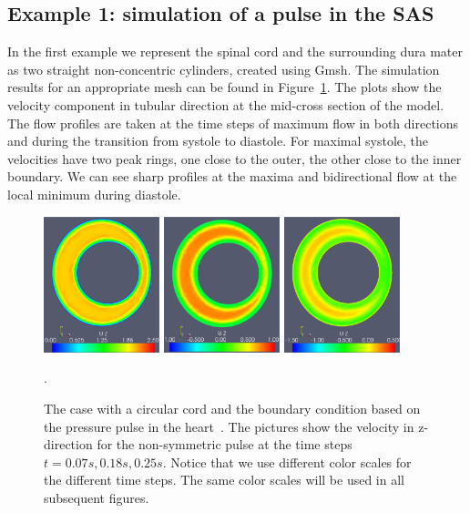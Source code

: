 \subsection{Example 1: simulation of a pulse in the SAS}

In the first example we represent the spinal cord and the surrounding dura mater as two straight non-concentric cylinders, created using Gmsh.
The simulation results for an appropriate mesh can be found in
Figure~\ref{fig:case1}. The plots show the velocity component in tubular direction
at the mid-cross section of the model. The flow profiles are taken at
the time steps of maximum flow in both directions and during the
transition from systole to diastole. For maximal systole, the
velocities have two peak rings, one close to the outer, the other
close to the inner boundary. We can see sharp profiles at the maxima
and bidirectional flow at the local minimum during diastole.

\begin{figure}\begin{center}
\includegraphics[width=0.3\textwidth]{chapters/hentschel/pdf/pulse_f1_08_sysmax_nmb7.pdf}
\includegraphics[width=0.3\textwidth]{chapters/hentschel/pdf/pulse_f1_08_sysdia_nmb18.pdf}
\includegraphics[width=0.3\textwidth]{chapters/hentschel/pdf/pulse_f1_08_diamin1_nmb25.pdf}
\caption{The case with a circular cord and the boundary condition based on
the pressure pulse in the heart~\citep{SmithChase2ShawEtAl2006}.
The pictures show the velocity in z-direction for the non-symmetric pulse at the time steps $t=0.07s, 0.18s, 0.25s$. Notice that we use different color scales for the different time steps. The same color scales
will be used in all subsequent figures. }
\label{fig:case1}.
\end{center}\end{figure}

